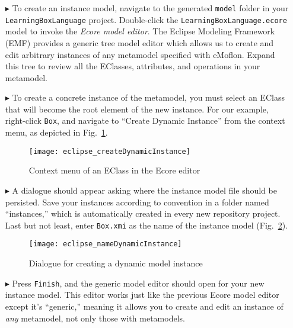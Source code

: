 \begin{itemize}

\item[$\blacktriangleright$] To create an instance model, navigate to the generated \texttt{model} folder in your \texttt{LearningBoxLanguage} project.
Double-click the \texttt{LearningBoxLa\-nguage.ecore} model to invoke  the \emph{Ecore model editor}. The Eclipse Modeling Framework (EMF) provides a generic
tree model editor which allows us to create and edit arbitrary instances of any metamodel specified with eMoflon. Expand this tree to review all the EClasses,
attributes, and operations in your metamodel.

\vspace{0.5cm}

\item[$\blacktriangleright$] To create a concrete instance of the metamodel, you must select an EClass that will become the root element of the new instance.
For our example, right-click \texttt{Box}, and navigate to ``Create Dynamic Instance'' from the context menu, as depicted in Fig.~\ref{fig:context_menu}.

\begin{figure}[htbp]
	\centering
  \texttt{[image: eclipse\_createDynamicInstance]}
	\caption{Context menu of an EClass in the Ecore editor}
	\label{fig:context_menu}
\end{figure}

\vspace{0.5cm}

\item[$\blacktriangleright$] A dialogue should appear asking where the instance model file should be persisted. Save your instances according to convention in a
folder named ``instances,'' which is automatically created in every new repository project. Last but not least, enter \texttt{Box.xmi} as the name of the
instance model (Fig.~\ref{fig:store_dynamic_instance}).

\vspace{0.5cm}

\begin{figure}[htbp]
	\centering
  \texttt{[image: eclipse\_nameDynamicInstance]}
	\caption{Dialogue for creating a dynamic model instance}
	\label{fig:store_dynamic_instance}
\end{figure}

\item[$\blacktriangleright$] Press \texttt{Finish}, and the generic model editor should open for your new instance model. This editor works just like the
previous Ecore model editor except it's ``generic,'' meaning it allows you to create and edit an instance of \emph{any} metamodel, not only those with
metamodels.


\end{itemize}
